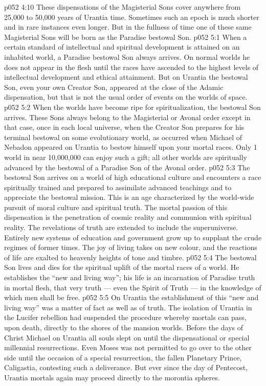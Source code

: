 \vs p052 4:10 \pc These dispensations of the Magisterial Sons cover anywhere from 25,000 to 50,000 years of Urantia time. Sometimes such an epoch is much shorter and in rare instances even longer. But in the fullness of time one of these same Magisterial Sons will be born as the Paradise bestowal Son.
\vs p052 5:1 When a certain standard of intellectual and spiritual development is attained on an inhabited world, a Paradise bestowal Son always arrives. On normal worlds he does not appear in the flesh until the races have ascended to the highest levels of intellectual development and ethical attainment. But on Urantia the bestowal Son, even your own Creator Son, appeared at the close of the Adamic dispensation, but that is not the usual order of events on the worlds of space.
\vs p052 5:2 When the worlds have become ripe for spiritualization, the bestowal Son arrives. These Sons always belong to the Magisterial or Avonal order except in that case, once in each local universe, when the Creator Son prepares for his terminal bestowal on some evolutionary world, as occurred when Michael of Nebadon appeared on Urantia to bestow himself upon your mortal races. Only 1 world in near 10,000,000 can enjoy such a gift; all other worlds are spiritually advanced by the bestowal of a Paradise Son of the Avonal order.
\vs p052 5:3 \pc The bestowal Son arrives on a world of high educational culture and encounters a race spiritually trained and prepared to assimilate advanced teachings and to appreciate the bestowal mission. This is an age characterized by the world\hyp{}wide pursuit of moral culture and spiritual truth. The mortal passion of this dispensation is the penetration of cosmic reality and communion with spiritual reality. The revelations of truth are extended to include the superuniverse. Entirely new systems of education and government grow up to supplant the crude regimes of former times. The joy of living takes on new colour, and the reactions of life are exalted to heavenly heights of tone and timbre.
\vs p052 5:4 The bestowal Son lives and dies for the spiritual uplift of the mortal races of a world. He establishes the “new and living way”; his life is an incarnation of Paradise truth in mortal flesh, that very truth --- even the Spirit of Truth --- in the knowledge of which men shall be free.
\vs p052 5:5 On Urantia the establishment of this “new and living way” was a matter of fact as well as of truth. The isolation of Urantia in the Lucifer rebellion had suspended the procedure whereby mortals can pass, upon death, directly to the shores of the mansion worlds. Before the days of Christ Michael on Urantia all souls slept on until the dispensational or special millennial resurrections. Even Moses was not permitted to go over to the other side until the occasion of a special resurrection, the fallen Planetary Prince, Caligastia, contesting such a deliverance. But ever since the day of Pentecost, Urantia mortals again may proceed directly to the morontia spheres.
